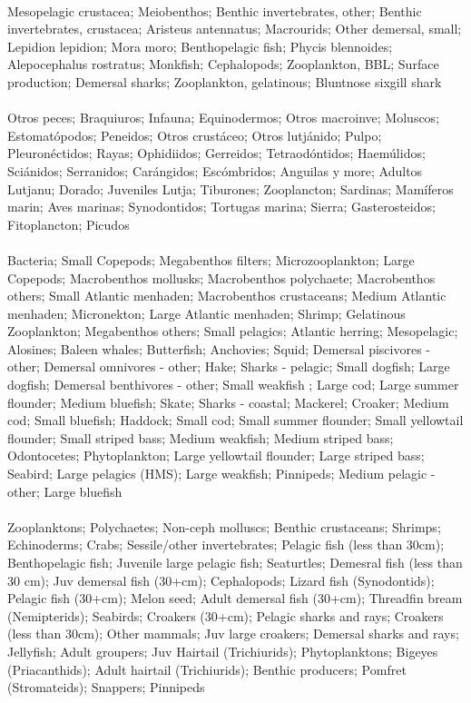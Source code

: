 \fullhline
\hline
{} \\
\hline
Mesopelagic crustacea; Meiobenthos; Benthic invertebrates, other; Benthic invertebrates, crustacea; Aristeus antennatus; Macrourids; Other demersal, small; Lepidion lepidion; Mora moro; Benthopelagic fish; Phycis blennoides; Alepocephalus rostratus; Monkfish; Cephalopods; Zooplankton, BBL; Surface production; Demersal sharks; Zooplankton, gelatinous; Bluntnose sixgill shark\\
\fullhline
\hline
{} \\
\hline
Otros peces; Braquiuros; Infauna; Equinodermos; Otros macroinve; Moluscos; Estomatópodos; Peneidos; Otros crustáceo; Otros lutjánido; Pulpo; Pleuronéctidos; Rayas; Ophidiidos; Gerreidos; Tetraodóntidos; Haemúlidos; Sciánidos; Serranidos; Carángidos; Escómbridos; Anguilas y more; Adultos Lutjanu; Dorado; Juveniles Lutja; Tiburones; Zooplancton; Sardinas; Mamíferos marin; Aves marinas; Synodontidos; Tortugas marina; Sierra; Gasterosteidos; Fitoplancton; Picudos\\
\fullhline
\hline
{} \\
\hline
Bacteria; Small Copepods; Megabenthos filters; Microzooplankton; Large Copepods; Macrobenthos mollusks; Macrobenthos polychaete; Macrobenthos others; Small Atlantic menhaden; Macrobenthos crustaceans; Medium Atlantic menhaden; Micronekton; Large Atlantic menhaden; Shrimp; Gelatinous Zooplankton; Megabenthos others; Small pelagics; Atlantic herring; Mesopelagic; Alosines; Baleen whales; Butterfish; Anchovies; Squid; Demersal piscivores - other; Demersal omnivores - other; Hake; Sharks - pelagic; Small dogfish; Large dogfish; Demersal benthivores - other; Small weakfish ; Large cod; Large summer  flounder; Medium bluefish; Skate; Sharks - coastal; Mackerel; Croaker; Medium cod; Small bluefish; Haddock; Small cod; Small summer  flounder; Small yellowtail flounder; Small striped bass; Medium weakfish; Medium striped bass; Odontocetes; Phytoplankton; Large yellowtail flounder; Large striped bass; Seabird; Large pelagics (HMS); Large weakfish; Pinnipeds; Medium pelagic - other; Large bluefish\\
\fullhline
\hline
{} \\
\hline
Zooplanktons; Polychaetes; Non-ceph molluscs; Benthic crustaceans; Shrimps; Echinoderms; Crabs; Sessile/other invertebrates; Pelagic fish (less than 30cm); Benthopelagic fish; Juvenile large pelagic fish; Seaturtles; Demesral fish (less than 30 cm); Juv demersal fish (30+cm); Cephalopods; Lizard fish (Synodontids); Pelagic fish (30+cm); Melon seed; Adult demersal fish (30+cm); Threadfin bream (Nemipterids); Seabirds; Croakers (30+cm); Pelagic sharks and rays; Croakers (less than 30cm); Other mammals; Juv large croakers; Demersal sharks and rays; Jellyfish; Adult groupers; Juv Hairtail (Trichiurids); Phytoplanktons; Bigeyes (Priacanthids); Adult hairtail (Trichiurids); Benthic producers; Pomfret (Stromateids); Snappers; Pinnipeds\\
